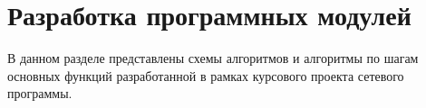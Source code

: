 \section{Разработка программных модулей}
\label{sec:development}

В данном разделе представлены схемы алгоритмов и алгоритмы по шагам
основных функций разработанной в рамках курсового проекта сетевого
программы.



